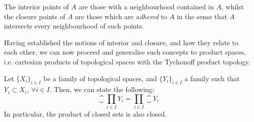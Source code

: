 \begin{remark}
	The interior points of $A$ are those with a neighbourhood contained in $A$, whilst the closure points of $A$ are those which are \emph{adhered} to $A$ in the sense that $A$ intersects every neighbourhood of such points.
\end{remark}

Having established the notions of interior and closure, and how they relate to each other, we can now proceed and generalise such concepts to product spaces, i.e. cartesian products of topological spaces with the Tychonoff product topology.

\begin{theorem}
	\label{th:closure-product-space}
	Let $\{X_i\}_{i\in I}$ be a family of topological spaces, and $\{Y_i\}_{i\in I}$ a family such that $Y_i\subset X_i$, $\forall i\in I$. Then, we can state the following:
	\[\closure{\prod_{i\in I}Y_i}=\prod_{i\in I}\closure{Y_i}\]
	In particular, the product of closed sets is also closed.
\end{theorem}

